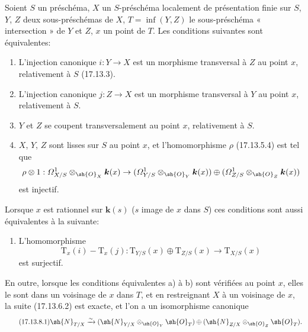 \begin{proposition}[17.13.8]
\label{IV.17.13.8}
Soient $S$ un préschéma, $X$ un $S$-préschéma localement de présentation finie sur $S$, $Y$, $Z$ deux sous-préschémas de $X$, $T=\inf(Y,Z)$ le sous-préschéma « intersection » de $Y$ et $Z$, $x$ un point de $T$. Les conditions suivantes sont équivalentes:
\begin{enumerate}
  \item[\textup{a)}] L'injection canonique $i:Y\to X$ est un morphisme transversal à $Z$ au point $x$, relativement à $S$ \textup{(17.13.3)}.
  \item[\textup{a$'$)}] L'injection canonique $j:Z\to X$ est un morphisme transversal à $Y$ au point $x$, relativement à $S$.
  \item[\textup{a$''$)}] $Y$ et $Z$ se coupent transversalement au point $x$, relativement à $S$.
  \item[\textup{b})] $X$, $Y$, $Z$ sont lisses sur $S$ au point $x$, et l'homomorphisme $\rho$ \textup{(17.13.5.4)} est tel que
  \[
  \rho\otimes1:\varOmega^1_{X/S}\otimes_{\sh{O}_X}\boldsymbol{k}(x)\to
  (\varOmega^1_{Y/S}\otimes_{\sh{O}_Y}\boldsymbol{k}(x))\oplus
  (\varOmega^1_{Z/S}\otimes_{\sh{O}_Z}\boldsymbol{k}(x))
  \]
  est injectif.
\end{enumerate}

Lorsque $x$ est rationnel sur $\boldsymbol{k}(s)$ \textup{(}$s$ image de $x$ dans $S$\textup{)} ces conditions sont aussi équivalentes à la suivante:
\begin{enumerate}
  \item[\textup{b$'$)}] L'homomorphisme
  \[
  \mathrm{T}_x(i)-\mathrm{T}_x(j):\mathrm{T}_{Y/S}(x)\oplus\mathrm{T}_{Z/S}(x)\to\mathrm{T}_{X/S}(x)
  \]
  est surjectif.
\end{enumerate}

En outre, lorsque les conditions équivalentes \textup{a)} à \textup{b)} sont vérifiées au point $x$, elles le sont dans un voisinage de $x$ dans $T$, et en restreignant $X$ à un voisinage de $x$, la suite \textup{(17.13.6.2)} est exacte, et l'on a un isomorphisme canonique
\[
\label{IV.17.13.8.1}
\tag{17.13.8.1}
\sh{N}_{T/X}\xrightarrow{\sim}
(\sh{N}_{Y/X}\otimes_{\sh{O}_Y}\sh{O}_T)\oplus
(\sh{N}_{Z/X}\otimes_{\sh{O}_Z}\sh{O}_T).
\]
\end{proposition}

